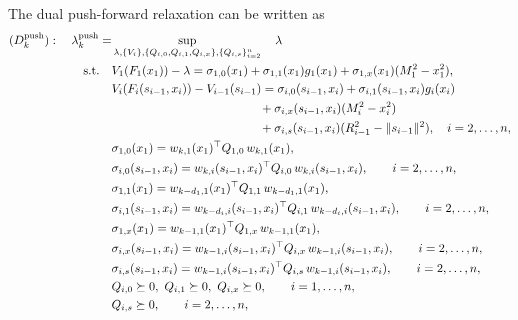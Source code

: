 \documentclass[11pt,a4paper]{article}
\theoremstyle{definition}
\begin{document}
The dual push-forward relaxation can be written as
\begin{equation}\label{eq:push-forward-dual-gram}
\begin{aligned}
(D^{\mathrm{push}}_k):\quad 
\lambda^{\mathrm{push}}_k
= &\sup_{\lambda,\{V_i\},\{Q_{i,0},Q_{i,1},Q_{i,x}\},\{Q_{i,s}\}_{i=2}^n}
\quad  \lambda\\
\text{s.t.}\quad 
& V_1(F_1(x_1)) - \lambda
 = \sigma_{1,0}(x_1) + \sigma_{1,1}(x_1) g_1(x_1)
 + \sigma_{1,x}(x_1)(M_1^2-x_1^2),\\
& V_i(F_i(s_{i-1},x_i)) - V_{i-1}(s_{i-1})
 = \sigma_{i,0}(s_{i-1},x_i)
 + \sigma_{i,1}(s_{i-1},x_i) g_i(x_i)\\
& \hspace{4.3cm}
 + \sigma_{i,x}(s_{i-1},x_i)(M_i^2-x_i^2)\\
& \hspace{4.3cm}
 + \sigma_{i,s}(s_{i-1},x_i)(R_{i-1}^2-\|s_{i-1}\|^2),\quad i=2,\dots,n,\\
& \sigma_{1,0}(x_1) = w_{k,1}(x_1)^\top Q_{1,0}\, w_{k,1}(x_1),\\
& \sigma_{i,0}(s_{i-1},x_i) = w_{k,i}(s_{i-1},x_i)^\top Q_{i,0}\, w_{k,i}(s_{i-1},x_i),
\qquad i=2,\dots,n,\\
& \sigma_{1,1}(x_1) = w_{k-d_1,1}(x_1)^\top Q_{1,1}\, w_{k-d_1,1}(x_1),\\
& \sigma_{i,1}(s_{i-1},x_i) = w_{k-d_i,i}(s_{i-1},x_i)^\top Q_{i,1}\, w_{k-d_i,i}(s_{i-1},x_i),
\qquad i=2,\dots,n,\\
& \sigma_{1,x}(x_1) = w_{k-1,1}(x_1)^\top Q_{1,x}\, w_{k-1,1}(x_1),\\
& \sigma_{i,x}(s_{i-1},x_i) = w_{k-1,i}(s_{i-1},x_i)^\top Q_{i,x}\, w_{k-1,i}(s_{i-1},x_i),
\qquad i=2,\dots,n,\\
& \sigma_{i,s}(s_{i-1},x_i) = w_{k-1,i}(s_{i-1},x_i)^\top Q_{i,s}\, w_{k-1,i}(s_{i-1},x_i),
\qquad i=2,\dots,n,\\
& Q_{i,0} \succeq 0,\ Q_{i,1} \succeq 0,\ Q_{i,x} \succeq 0,\qquad i=1,\dots,n,\\
& Q_{i,s} \succeq 0,\qquad i=2,\dots,n,
\end{aligned}
\end{equation}
\end{document}
